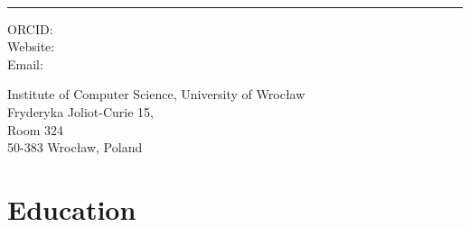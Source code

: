 \documentclass[10pt,a4paper]{article}
\begin{document}
\begin{minipage}[t]{0.5\textwidth}
  {\fontsize{20pt}{0}\selectfont\MyName}
\end{minipage}
\begin{minipage}[t]{0.5\textwidth}
  \begin{flushright}
    \Title{}
  \end{flushright}
\end{minipage}
\\[-0.1cm]
\textcolor{lightgray}{\rule{\textwidth}{3pt}}
\begin{minipage}[t]{0.5\textwidth}
  ORCID: \href{https://orcid.org/\ORCID}{\ORCID}
  \\
  Website: \Website{\PersonalWebsite}
  \\
  Email: \href{mailto:\Email}{\Email}
\end{minipage}
\begin{minipage}[t]{0.5\textwidth}
  \begin{flushright}
  Institute of Computer Science, University of Wrocław\\
  Fryderyka Joliot-Curie 15,\\
  Room 324\\
  50-383 Wrocław, Poland
  \end{flushright}
\end{minipage}
\vspace{0.3cm}


\section{Education}
\end{document}
